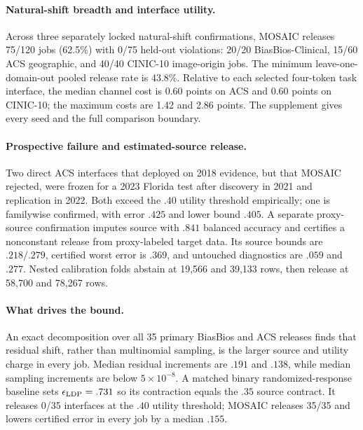 \paragraph{Natural-shift breadth and interface utility.}
Across three separately locked natural-shift confirmations, MOSAIC releases 75/120 jobs (62.5\%) with 0/75 held-out violations: 20/20 BiasBios-Clinical, 15/60 ACS geographic, and 40/40 CINIC-10 image-origin jobs. The minimum leave-one-domain-out pooled release rate is 43.8\%. Relative to each selected four-token task interface, the median channel cost is 0.60 points on ACS and 0.60 points on CINIC-10; the maximum costs are 1.42 and 2.86 points. The supplement gives every seed and the full comparison boundary.

\paragraph{Prospective failure and estimated-source release.}
Two direct ACS interfaces that deployed on 2018 evidence, but that MOSAIC
rejected, were frozen for a 2023 Florida test after discovery in 2021 and
replication in 2022. Both exceed the $.40$ utility threshold empirically; one
is familywise confirmed, with error $.425$ and lower bound $.405$. A separate
proxy-source confirmation imputes source with $.841$ balanced accuracy and
certifies a nonconstant release from proxy-labeled target data. Its source
bounds are $.218/.279$, certified worst error is $.369$, and untouched
diagnostics are $.059$ and $.277$. Nested calibration folds abstain at 19,566
and 39,133 rows, then release at 58,700 and 78,267 rows.

\paragraph{What drives the bound.}
An exact decomposition over all 35 primary BiasBios and ACS releases finds
that residual shift, rather than multinomial sampling, is the larger source
and utility charge in every job. Median residual increments are $.191$ and
$.138$, while median sampling increments are below $5\times10^{-8}$. A
matched binary randomized-response baseline sets
$\epsilon_{\rm LDP}=.731$ so its contraction equals the $.35$ source
contract. It releases 0/35 interfaces at the $.40$ utility threshold; MOSAIC
releases 35/35 and lowers certified error in every job by a median $.155$.
